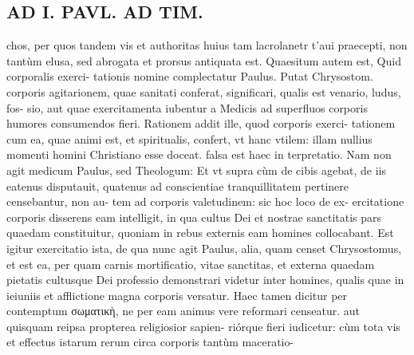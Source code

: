 \documentclass{article}
\begin{document}
\begin{pages}
\section*{AD I. PAVL. AD TIM. }
\marginpar{[ p.208 ]}\pstart chos, per quos tandem vis et authoritas huius tam lacrolanetr t'aui praecepti, non tantùm elusa, sed abrogata et prorsus antiquata est.  \pend\pstart Quaesitum autem est, Quid corporalis exerci- tationis nomine complectatur Paulus. Putat Chrysostom. corporis agitarionem, quae sanitati conferat, significari, qualis est venario, ludus, fos- sio, aut quae exercitamenta iubentur a Medicis ad superfluos corporis humores consumendos fieri. Rationem addit ille, quod corporis exerci- tationem cum ea, quae animi est, et spiritualis, confert, vt hanc vtilem: illam nullius momenti homini Christiano esse doceat. falsa est haec in terpretatio. Nam non agit medicum Paulus, sed Theologum: Et vt supra cùm de cibis agebat, de iis eatenus disputauit, quatenus ad conscientiae tranquillitatem pertinere censebantur, non au- tem ad corporis valetudinem: sic hoc loco de ex- ercitatione corporis disserens eam intelligit, in qua cultus Dei et nostrae sanctitatis pars quaedam constituitur, quoniam in rebus externis eam homines collocabant.  \pend\pstart Est igitur exercitatio ista, de qua nunc agit Paulus, alia, quam censet Chrysostomus, et est ea, per quam carnis mortificatio, vitae sanctitas, et externa quaedam pietatis cultusque Dei professio demonstrari videtur inter homines, qualis quae in ieiuniis et afflictione magna corporis versatur. Haec tamen dicitur per contemptum σωματικὴ, ne per eam animus vere reformari censeatur. aut quisquam reipsa propterea religiosior sapien- riórque fieri iudicetur: cùm tota vis et effectus istarum rerum circa corporis tantùm maceratio-  \pend

\end{pages}
\end{document}
